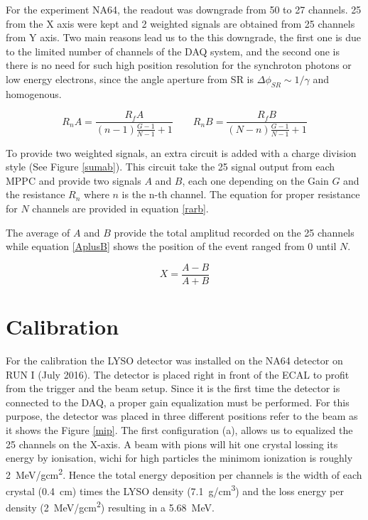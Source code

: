 For the experiment NA64, the readout was downgrade from 50 to 27 channels.  25 from the X axis were
kept and 2 weighted signals are obtained from 25 channels from Y axis. Two main reasons lead us to the this downgrade,
the first one is due to the limited number of channels of the DAQ system, and the second one is there is no need for
such high position resolution for the synchroton photons or low energy electrons, since the angle aperture from SR is
$\Delta \phi_{SR}\sim 1/\gamma$ and homogenous.\par

\begin{equation}\label{rarb}
R_n A = \frac{ R_f A}{ (n-1)\frac{G-1}{N-1}+1} \qquad R_n B = \frac{ R_f B}{ (N-n)\frac{G-1}{N-1}+1}
\end{equation}

To provide two weighted signals, an extra circuit is added with a charge division style (See Figure \ref{sumab}). This
circuit take the 25 signal output from each MPPC and provide two signals $A$ and $B$, each one depending on the Gain $G$
and the resistance $R_n$ where $n$ is the n-th channel. The equation for proper resistance for $N$ channels are provided
in equation \ref{rarb}.\par

The average of $A$ and $B$ provide the total amplitud recorded on the 25 channels while equation \ref{AplusB} shows the
position of the event ranged from 0 until $N$.

\begin{equation}\label{AplusB}
X = \frac{A-B}{A+B}
\end{equation}


\section{Calibration}

For the calibration the LYSO detector was installed on the NA64 detector on RUN I (July 2016). The detector is placed
right in front of the ECAL to profit from the trigger and the beam setup. Since it is the first time the detector is
connected to the DAQ\cite{compass}, a proper gain equalization must be performed. For this purpose, the detector was
placed in three different positions refer to the beam as it shows the Figure \ref{mip}. The first configuration (a),
allows us to equalized the 25 channels on the X-axis. A beam with pions will hit one crystal lossing its energy by
ionisation, wichi for high particles the minimom ionization is roughly \SI{2}{MeV/gcm^2}. Hence the total energy
deposition per channels is the width of each crystal (\SI{0.4}{cm}) times the LYSO density (\SI{7.1}{g/cm^3}) and the
loss energy per density (\SI{2}{MeV/gcm^2}) resulting in a \SI{5.68}{MeV}.

